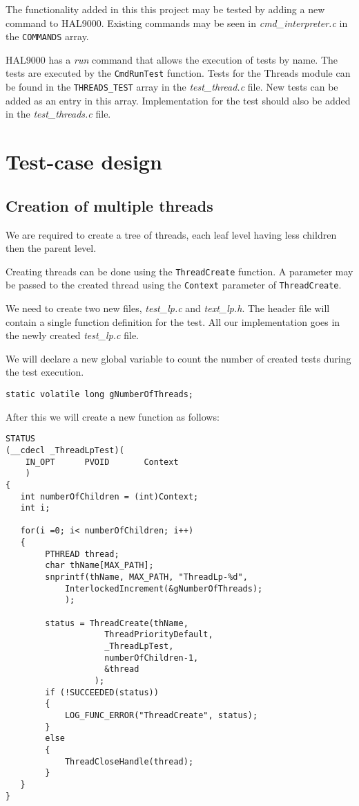 \documentclass[a4paper,12pt]{report}
\begin{document}
The functionality added in this this project may be tested by adding a new command to HAL9000. Existing commands may be seen in \textit{cmd\_interpreter.c} in the \lstinline|COMMANDS| array. 

HAL9000 has a \textit{run} command that allows the execution of tests by name. The tests are executed by the \lstinline|CmdRunTest| function. Tests for the Threads module can be found in the \lstinline|THREADS_TEST| array in the \textit{test\_thread.c} file. New tests can be added as an entry in this array. Implementation for the test should also be added in the \textit{test\_threads.c} file.  

\section{Test-case design}

\subsection{Creation of multiple threads}

We are required to create a tree of threads, each leaf level having less children then the parent level. 

Creating threads can be done using the \lstinline|ThreadCreate| function. A parameter may be passed to the created thread using the \lstinline|Context| parameter of \lstinline|ThreadCreate|.


We need to create two new files, \textit{test\_lp.c} and \textit{text\_lp.h}. The header file will contain a single function definition for the test.  All our implementation goes in the newly created \textit{test\_lp.c} file. 

We will declare a new global variable to count the number of created tests during the test execution. 
\begin{lstlisting}
static volatile long gNumberOfThreads;
\end{lstlisting}

After this we will create a new function as follows:
\begin{lstlisting}
STATUS
(__cdecl _ThreadLpTest)(
    IN_OPT      PVOID       Context
    )
{
   int numberOfChildren = (int)Context;
   int i;

   for(i =0; i< numberOfChildren; i++)
   {
        PTHREAD thread;
        char thName[MAX_PATH];
        snprintf(thName, MAX_PATH, "ThreadLp-%d",
            InterlockedIncrement(&gNumberOfThreads);
            );

        status = ThreadCreate(thName,
                    ThreadPriorityDefault,
                    _ThreadLpTest,
                    numberOfChildren-1,
                    &thread
                  );
        if (!SUCCEEDED(status))
        {
            LOG_FUNC_ERROR("ThreadCreate", status);
        }
        else
        {
            ThreadCloseHandle(thread);
        }
   }
}
\end{lstlisting}
\end{document}
